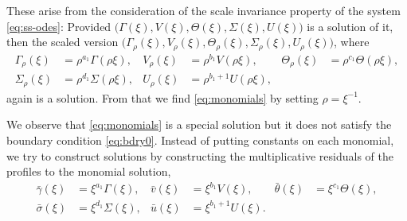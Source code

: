 \documentclass[a4paper,11pt]{article}
\def\bg{{\bar{\gamma}}}
\def\bv{{\bar{v}}}
\def\bth{{\bar{\theta}}}
\def\bs{{\bar{\sigma}}}
\def\bu{{\bar{u}}}
\begin{document}
These arise from the consideration of the scale invariance property of the system \eqref{eq:ss-odes}: Provided $\big(\Gamma(\xi), V(\xi), \Theta(\xi), \Sigma(\xi), U(\xi)\big)$ is a solution of it, then the scaled version $\big(\Gamma_\rho(\xi), V_\rho(\xi), \Theta_\rho(\xi), \Sigma_\rho(\xi), U_\rho(\xi)\big)$, where
\begin{align*}
 \Gamma_\rho(\xi)&=\rho^{a_1}\Gamma(\rho\xi), & V_\rho(\xi)&=\rho^{b_1}V(\rho\xi), & \Theta_\rho(\xi)&=\rho^{c_1}\Theta(\rho\xi),\\
 \Sigma_\rho(\xi)&=\rho^{d_1}\Sigma(\rho\xi), & U_\rho(\xi)&=\rho^{b_1+1}U(\rho\xi),
\end{align*}
again is a solution. From that we find \eqref{eq:monomials} by setting $\rho=\xi^{-1}$.

We observe that \eqref{eq:monomials} is a special solution but it does not satisfy the boundary condition \eqref{eq:bdry0}. Instead of putting constants on each monomial, we try to construct solutions by constructing the multiplicative residuals of the profiles to the monomial solution, 
\begin{equation} \label{eq:CAPtoBAR}
\begin{aligned}
 \bg(\xi)&=\xi^{a_1}\Gamma(\xi), &
 \bv(\xi)&=\xi^{b_1}V(\xi), &
 \bth(\xi)&=\xi^{c_1}\Theta(\xi), \\
 \bs(\xi)&=\xi^{d_1}\Sigma(\xi), &
 \bu(\xi)&=\xi^{b_1+1}U(\xi).
\end{aligned}
\end{equation}
\end{document}
